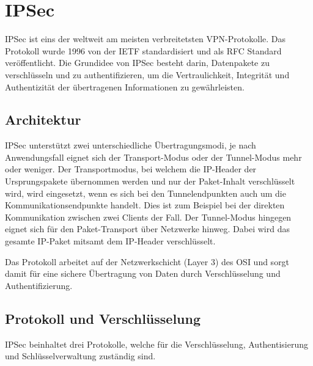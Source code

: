 \section{IPSec} \label{ipsec}

\acrfull{IPSec} ist eins der weltweit am meisten verbreitetsten \gls{VPN}-Protokolle. Das Protokoll wurde 1996 von der \gls{IETF} standardisiert und als \gls{RFC} Standard veröffentlicht. Die Grundidee von \gls{IPSec} besteht darin, Datenpakete zu verschlüsseln und zu authentifizieren, um die Vertraulichkeit, Integrität und Authentizität der übertragenen Informationen zu gewährleisten.

\subsection{Architektur}
\gls{IPSec} unterstützt zwei unterschiedliche Übertragungsmodi, je nach Anwendungsfall eignet sich der Transport-Modus oder der Tunnel-Modus mehr oder weniger. Der Transportmodus, bei welchem die \gls{IP}-Header der Ursprungspakete übernommen werden und nur der Paket-Inhalt verschlüsselt wird, wird eingesetzt, wenn es sich bei den Tunnelendpunkten auch um die Kommunikationsendpunkte handelt. Dies ist zum Beispiel bei der direkten Kommunikation zwischen zwei Clients der Fall. Der Tunnel-Modus hingegen eignet sich für den Paket-Transport über Netzwerke hinweg. Dabei wird das gesamte \gls{IP}-Paket mitsamt dem \gls{IP}-Header verschlüsselt.

Das Protokoll arbeitet auf der Netzwerkschicht (Layer 3) des \gls{OSI} und sorgt damit für eine sichere Übertragung von Daten durch Verschlüsselung und Authentifizierung.

\subsection{Protokoll und Verschlüsselung}
\gls{IPSec} beinhaltet drei Protokolle, welche für die Verschlüsselung, Authentisierung und Schlüsselverwaltung zuständig sind.

